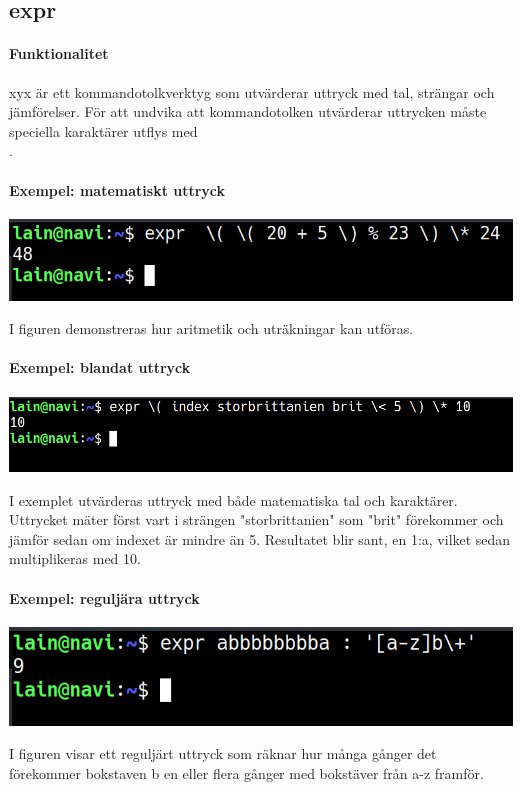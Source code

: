 \subsection{expr}
\paragraph{Funktionalitet}
xyx är ett kommandotolkverktyg som utvärderar uttryck med tal, strängar och jämförelser. För att undvika att kommandotolken utvärderar uttrycken måste speciella karaktärer utflys med \\. 
\paragraph{Exempel: matematiskt uttryck}
\begin{center}
        \includegraphics[width=\linewidth]{bilder/expr_matte.png}
\end{center}
I figuren demonstreras hur aritmetik och uträkningar kan utföras.
\paragraph{Exempel: blandat uttryck}
\begin{center}
        \includegraphics[width=\linewidth]{bilder/expr_blandat.png}
\end{center}
I exemplet utvärderas uttryck med både matematiska tal och karaktärer. Uttrycket mäter först vart i strängen "storbrittanien" som "brit" förekommer och jämför sedan om indexet är mindre än 5. Resultatet blir sant, en 1:a, vilket sedan multiplikeras med 10.  
\paragraph{Exempel: reguljära uttryck}
\begin{center}
        \includegraphics[width=\linewidth]{bilder/expr_regular.png}
\end{center}
I figuren visar ett reguljärt uttryck som räknar hur många gånger det förekommer bokstaven b en eller flera gånger med bokstäver från a-z framför.
